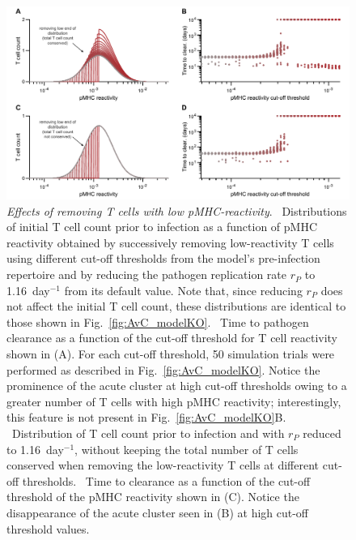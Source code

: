 \begin{figure}
    \centering
    \includegraphics[width=\textwidth]{Figures/AvC/figS3_modelKO.pdf}
    \caption[Effects of removing T cells with low pMHC-reactivity]{\textit{Effects of removing T cells with low pMHC-reactivity}. %
    ~Distributions of initial T cell count prior to infection as a function of pMHC reactivity obtained by successively removing low-reactivity T cells using different cut-off thresholds from the model’s pre-infection repertoire and by reducing the pathogen replication rate $r_P$ to 1.16~day$^{-1}$ from its default value. Note that, since reducing $r_P$ does not affect the initial T cell count, these distributions are identical to those shown in Fig.~\ref{fig:AvC_modelKO}. %
    ~Time to pathogen clearance as a function of the cut-off threshold for T cell reactivity shown in (A). For each cut-off threshold, 50 simulation trials were performed as described in Fig.~\ref{fig:AvC_modelKO}. Notice the prominence of the acute cluster at high cut-off thresholds owing to a greater number of T cells with high pMHC reactivity; interestingly, this feature is not present in Fig.~\ref{fig:AvC_modelKO}B. %
    ~Distribution of T cell count prior to infection and with $r_P$ reduced to 1.16~day$^{-1}$, without keeping the total number of T cells conserved when removing the low-reactivity T cells at different cut-off thresholds. %
    ~Time to clearance as a function of the cut-off threshold of the pMHC reactivity shown in (C). Notice the disappearance of the acute cluster seen in (B) at high cut-off threshold values.}
    \label{fig:AvC_supp_modelKO}
\end{figure}

